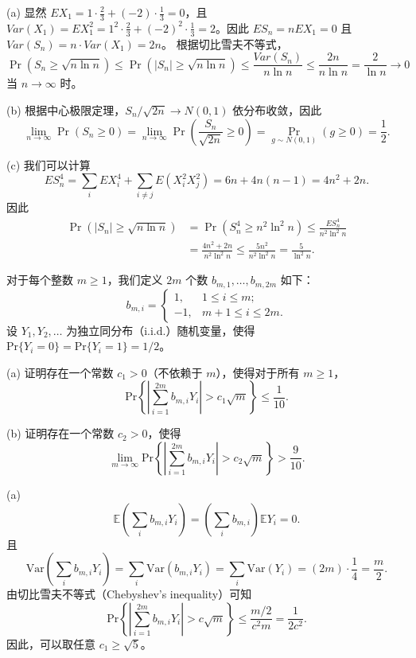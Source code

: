 \begin{questions}
\begin{solution}
(a) 显然 $E X_1 = 1 \cdot \frac{2}{3} + (-2) \cdot \frac{1}{3} = 0$，且 $Var(X_1) = E X_1^2 = 1^2 \cdot \frac{2}{3} + (-2)^2 \cdot \frac{1}{3} = 2$。因此 $E S_n = n E X_1 = 0$ 且 $Var(S_n) = n \cdot Var(X_1) = 2n$。
根据切比雪夫不等式，
\[
\Pr(S_n \ge \sqrt{n \ln n}) \le \Pr(|S_n| \ge \sqrt{n \ln n}) \le \frac{Var(S_n)}{n \ln n} \le \frac{2n}{n \ln n} = \frac{2}{\ln n} \to 0
\]
当 $n \to \infty$ 时。

(b) 根据中心极限定理，$S_n/\sqrt{2n} \to N(0, 1)$ 依分布收敛，因此
\[
\lim_{n \to \infty} \Pr(S_n \ge 0) = \lim_{n \to \infty} \Pr\left( \frac{S_n}{\sqrt{2n}} \ge 0 \right) = \Pr_{g \sim N(0, 1)}(g \ge 0) = \frac{1}{2}.
\]

(c) 我们可以计算
\[
E S_n^4 = \sum_i E X_i^4 + \sum_{i \neq j} E(X_i^2 X_j^2) = 6n + 4n(n - 1) = 4n^2 + 2n.
\]
因此
\begin{align*}
\Pr(|S_n| \ge \sqrt{n \ln n}) &= \Pr(S_n^4 \ge n^2 \ln^2 n) \le \frac{E S_n^4}{n^2 \ln^2 n} \\
&= \frac{4n^2 + 2n}{n^2 \ln^2 n} \le \frac{5n^2}{n^2 \ln^2 n} = \frac{5}{\ln^2 n}.
\end{align*}
\end{solution}

\question
对于每个整数 $m \geq 1$，我们定义 $2m$ 个数 $b_{m,1}, \dots, b_{m,2m}$ 如下：
\[
b_{m,i} = \begin{cases} 1, & 1 \leq i \leq m; \\ -1, & m + 1 \leq i \leq 2m. \end{cases}
\]
设 $Y_1, Y_2, \dots$ 为独立同分布（i.i.d.）随机变量，使得 $\text{Pr}\{Y_i = 0\} = \text{Pr}\{Y_i = 1\} = 1/2$。

(a) 证明存在一个常数 $c_1 > 0$（不依赖于 $m$），使得对于所有 $m \geq 1$，
\[
\text{Pr} \left\{ \left| \sum_{i=1}^{2m} b_{m,i} Y_i \right| > c_1 \sqrt{m} \right\} \leq \frac{1}{10}.
\]

(b) 证明存在一个常数 $c_2 > 0$，使得
\[
\lim_{m \to \infty} \text{Pr} \left\{ \left| \sum_{i=1}^{2m} b_{m,i} Y_i \right| > c_2 \sqrt{m} \right\} > \frac{9}{10}.
\]

\begin{solution}
(a) 
\[
\mathbb{E}\left( \sum_i b_{m,i} Y_i \right) = \left( \sum_i b_{m,i} \right) \mathbb{E}Y_i = 0.
\]
且
\[
\text{Var} \left( \sum_i b_{m,i} Y_i \right) = \sum_i \text{Var}(b_{m,i} Y_i) = \sum_i \text{Var}(Y_i) = (2m) \cdot \frac{1}{4} = \frac{m}{2}.
\]
由切比雪夫不等式（Chebyshev's inequality）可知
\[
\text{Pr} \left\{ \left| \sum_{i=1}^{2m} b_{m,i} Y_i \right| > c \sqrt{m} \right\} \leq \frac{m/2}{c^2 m} = \frac{1}{2c^2}.
\]
因此，可以取任意 $c_1 \geq \sqrt{5}$。


\end{solution}
\end{questions}
